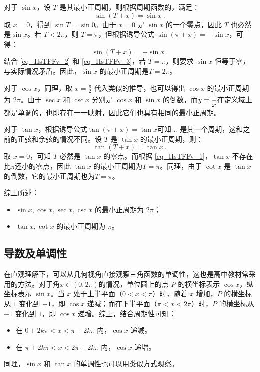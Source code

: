 对于 $\sin x$，设 $T$ 是其最小正周期，则根据周期函数的，满足：
\begin{equation}\label{eq_HsTFFv_2}
\sin (T+x) = \sin x~.
\end{equation}
取 $x=0$，得到 $\sin T = \sin 0$。由于 $x=0$ 是 $\sin x$ 的一个零点，因此 $T$ 也必然是$\sin x$。若 $T<2\pi$，则 $T=\pi$，但根据诱导公式 $\sin(\pi + x) = -\sin x$，可得：
\begin{equation}\label{eq_HsTFFv_3}
\sin (T + x) = -\sin x~.
\end{equation}
结合 \autoref{eq_HsTFFv_2} 和 \autoref{eq_HsTFFv_3}，若 $T=\pi$，则要求 $\sin x$ 恒等于零，与实际情况矛盾。因此，$\sin x$ 的最小正周期是$T = 2\pi$。

对于 $\cos x$，同理，取 $\displaystyle x=\frac{\pi}{2}$ 代入类似的推导，也可以得出 $\cos x$ 的最小正周期为 $2\pi$。由于 $\sec x$ 和 $\csc x$ 分别是 $\cos x$ 和 $\sin x$ 的倒数，而$\displaystyle y={1\over x}$在定义域上都是单调的，也即存在一一映射，因此它们也具有相同的最小正周期。

对于 $\tan x$，根据诱导公式$\tan (\pi + x) = \tan x$可知 $\pi$ 是其一个周期，这和之前的正弦和余弦的情况不同。设 $T$ 是 $\tan x$ 的最小正周期，则：
\begin{equation}
\tan (T + x) = \tan x~.
\end{equation}
取 $x=0$，可知 $T$ 必然是 $\tan x$ 的零点。而根据 \autoref{eq_HsTFFv_1}，$\tan x$ 不存在比$\pi$还小的零点，因此 $\tan x$ 的最小正周期为$T = \pi$。同理，由于 $\cot x$ 是 $\tan x$ 的倒数，它的最小正周期也为$T = \pi$。

综上所述：
\begin{itemize}
\item $\sin x, \cos x, \sec x, \csc x$ 的最小正周期为 $\displaystyle 2\pi$；
\item $\tan x, \cot x$ 的最小正周期为 $\pi$。
\end{itemize}

\subsection{导数及单调性}

在直观理解下，可以从几何视角直接观察三角函数的单调性，这也是高中教材常采用的方法。对于角$x\in(0,2\pi)$的情况，单位圆上的点 $P$ 的横坐标表示 $\cos x$，纵坐标表示 $\sin x$。当 $x$ 处于上半平面（$0 < x < \pi$）时，随着 $x$ 增加，$P$ 的横坐标从 $1$ 变化到 $-1$，即 $\cos x$ 递减；而在下半平面（$\pi < x < 2\pi$）时，$P$ 的横坐标从 $-1$ 变化到 $1$，即 $\cos x$ 递增。综上，结合周期性可知：
\begin{itemize}
\item 在 $0 + 2k\pi < x < \pi + 2k\pi$ 内，$\cos x$ 递减。
\item 在 $\pi + 2k\pi < x < 2\pi + 2k\pi$ 内，$\cos x$ 递增。
\end{itemize}
同理，$\sin x$ 和 $\tan x$ 的单调性也可以用类似方式观察。

